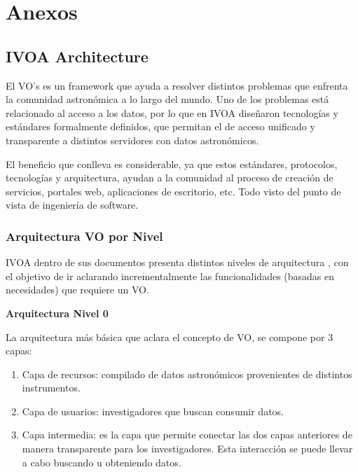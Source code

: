 \section{Anexos}
\subsection{IVOA Architecture}


El VO's es un framework que ayuda a resolver distintos
problemas que enfrenta la comunidad astronómica a lo largo del mundo.  Uno de
los problemas está relacionado al acceso a los datos, por lo que en IVOA
diseñaron tecnologías y estándares formalmente definidos, que permitan el de
acceso unificado y transparente a distintos servidores con datos astronómicos.

El beneficio que conlleva es considerable, ya que estos
estándares, protocolos, tecnologías y arquitectura, ayudan a la comunidad al
proceso de creación de servicios, portales web, aplicaciones de escritorio,
etc. Todo visto del punto de vista de ingeniería de software.

\subsubsection{Arquitectura VO por Nivel}


IVOA dentro de sus documentos presenta distintos niveles de arquitectura
\cite{ivoa_arch}, con el objetivo de ir aclarando incrementalmente las
funcionalidades (basadas en necesidades) que requiere un VO.

\textbf{Arquitectura Nivel 0} %


La arquitectura más básica que aclara el concepto de VO, se compone por 3
capas:

\begin{enumerate}
    \item Capa de recursos:
          compilado de datos astronómicos provenientes de distintos instrumentos.
    \item Capa de usuarios:
          investigadores que buscan consumir datos.
    \item Capa intermedia:
          es la capa que permite conectar las dos
          capas anteriores de manera transparente para los investigadores.
          Esta interacción se puede llevar a cabo buscando u obteniendo datos.
\end{enumerate}

